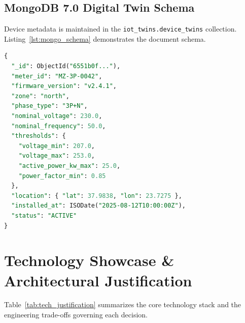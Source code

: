 \documentclass[11pt,a4paper]{article}
\begin{document}
\subsection{MongoDB 7.0 Digital Twin Schema}

Device metadata is maintained in the \texttt{iot\_twins.device\_twins} collection. Listing~\ref{lst:mongo_schema} demonstrates the document schema.

\begin{lstlisting}[language=SQL, caption={MongoDB Device Twin Document Structure}, label={lst:mongo_schema}]
{
  "_id": ObjectId("6551b0f..."),
  "meter_id": "MZ-3P-0042",
  "firmware_version": "v2.4.1",
  "zone": "north",
  "phase_type": "3P+N",
  "nominal_voltage": 230.0,
  "nominal_frequency": 50.0,
  "thresholds": {
    "voltage_min": 207.0,
    "voltage_max": 253.0,
    "active_power_kw_max": 25.0,
    "power_factor_min": 0.85
  },
  "location": { "lat": 37.9838, "lon": 23.7275 },
  "installed_at": ISODate("2025-08-12T10:00:00Z"),
  "status": "ACTIVE"
}
\end{lstlisting}

\section{Technology Showcase \& Architectural Justification}

Table~\ref{tab:tech_justification} summarizes the core technology stack and the engineering trade-offs governing each decision.
\end{document}
